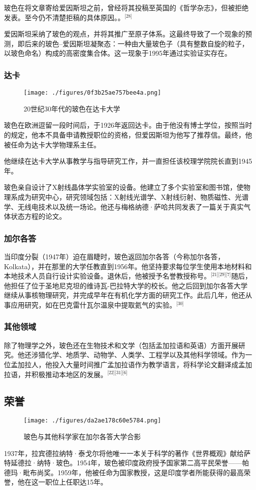 玻色在将文章寄给爱因斯坦之前，曾经将其投稿至英国的《哲学杂志》，但被拒绝发表。至今仍不清楚拒稿的具体原因。。\(^\text{[28]}\)

爱因斯坦采纳了玻色的观点，并将其推广至原子体系。这最终导致了一个现象的预测，即后来的玻色–爱因斯坦凝聚态：一种由大量玻色子（具有整数自旋的粒子，以玻色命名）构成的高密度集合体。这一现象于1995年通过实验证实存在。
\subsubsection{达卡}
\begin{figure}[ht]
\centering
\texttt{[image: ./figures/0f3b25ae757bee4a.png]}
\caption{20世纪30年代的玻色在达卡大学} \label{fig_BOSE_4}
\end{figure}
玻色在欧洲逗留一段时间后，于1926年返回达卡。由于他没有博士学位，按照当时的规定，他本不具备申请教授职位的资格，但爱因斯坦为他写了推荐信。最终，他被任命为达卡大学物理系主任。

他继续在达卡大学从事教学与指导研究工作，并一直担任该校理学院院长直到1945年。

玻色亲自设计了X射线晶体学实验室的设备。他建立了多个实验室和图书馆，使物理系成为研究中心，研究领域包括：X射线光谱学、X射线衍射、物质磁性、光谱学、无线电技术以及统一场论。他还与梅格纳德·萨哈共同发表了一篇关于真实气体状态方程的论文。
\subsubsection{加尔各答}
当印度分裂（1947年）迫在眉睫时，玻色返回加尔各答（今称加尔各答，Kolkata），并在那里的大学任教直到1956年。他坚持要求每位学生使用本地材料和本地技术人员自行设计实验设备。退休后，他被授予名誉教授称号。\(^\text{[21][29][7]}\)随后，他担任了位于圣地尼克坦的维诗瓦-巴拉特大学的校长。他之后回到加尔各答大学继续从事核物理研究，并完成早年在有机化学方面的研究工作。此后几年，他还从事应用研究，如在巴克雷什瓦尔温泉中提取氦气的实验。\(^\text{[30]}\)
\subsubsection{其他领域}
除了物理学之外，玻色还在生物技术和文学（包括孟加拉语和英语）方面开展研究。他还涉猎化学、地质学、动物学、人类学、工程学以及其他科学领域。作为一位孟加拉人，他投入大量时间推广孟加拉语作为教学语言，将科学论文翻译成孟加拉语，并积极推动本地区的发展。\(^\text{[22][31][6]}\)
\subsection{荣誉}
\begin{figure}[ht]
\centering
\texttt{[image: ./figures/da2ae178c60e5784.png]}
\caption{玻色与其他科学家在加尔各答大学合影} \label{fig_BOSE_5}
\end{figure}
1937年，拉宾德拉纳特·泰戈尔将他唯一一本关于科学的著作《世界概观》献给萨特延德拉·纳特·玻色。1954年，玻色被印度政府授予国家第二高平民荣誉——帕德玛·毗布尚奖。1959年，他被任命为国家教授，这是印度学者所能获得的最高荣誉，他在这一职位上任职达15年。

